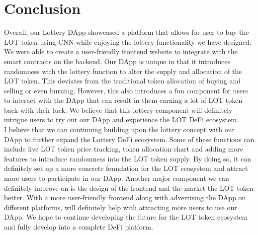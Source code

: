 \documentclass[11pt]{article}
\begin{document}
\section*{Conclusion}
Overall, our Lottery DApp showcased a platform that allows for user to buy the LOT token using CNN while enjoying the lottery functionality we have designed. We were able to create a user-friendly frontend website to integrate with the smart contracts on the backend. Our DApp is unique in that it introduces randomness with the lottery function to alter the supply and allocation of the LOT token. This deviates from the traditional token allocation of buying and selling or even burning. However, this also introduces a fun component for users to interact with the DApp that can result in them earning a lot of LOT token back with their luck. We believe that this lottery component will definitely intrigue users to try out our DApp and experience the LOT DeFi ecosystem.\\
I believe that we can continuing building upon the lottery concept with our DApp to further expand the Lottery DeFi ecosystem. Some of these functions can include live LOT token price tracking, token allocation chart and adding more features to introduce randomness into the LOT token supply. By doing so, it can definitely set up a more concrete foundation for the LOT ecosystem and attract more users to participate in our DApp. Another major component we can definitely improve on is the design of the frontend and the market the LOT token better. With a more user-friendly frontend along with advertising the DApp on different platforms, will definitely help with attracting more users to use our DApp. We hope to continue developing the future for the LOT token ecosystem and fully develop into a complete DeFi platform.

\newpage
\printbibliography[title=References]
\end{document}
